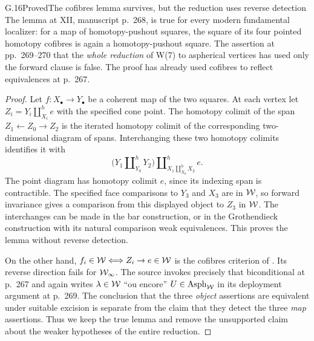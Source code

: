 \begin{claim}{G.16}{Proved}{The cofibres lemma survives, but the reduction uses reverse detection}
The lemma at XII, manuscript p.~268, is true for every modern fundamental localizer: for a map of homotopy-pushout squares, the square of its four pointed homotopy cofibres is again a homotopy-pushout square. The assertion at pp.~269--270 that the \emph{whole reduction} of W(7) to aspherical vertices has used only the forward clause is false. The proof has already used cofibres to reflect equivalences at p.~267.
\end{claim}
\begin{proof}
Let $f:X_\bullet\to Y_\bullet$ be a coherent map of the two squares. At each vertex let $Z_i=Y_i\amalg^h_{X_i}e$ with the specified cone point. The homotopy colimit of the span $Z_1\leftarrow Z_0\to Z_2$ is the iterated homotopy colimit of the corresponding two-dimensional diagram of spans. Interchanging these two homotopy colimits identifies it with
\[
\bigl(Y_1\amalg^h_{Y_0}Y_2\bigr)
\amalg^h_{X_1\amalg^h_{X_0}X_2}e.
\]
The point diagram has homotopy colimit $e$, since its indexing span is contractible. The specified face comparisons to $Y_3$ and $X_3$ are in $\mathcal{W}$, so forward invariance gives a comparison from this displayed object to $Z_3$ in $\mathcal{W}$. The interchanges can be made in the bar construction, or in the Grothendieck construction with its natural comparison weak equivalences. This proves the lemma without reverse detection.

On the other hand, $f_i\in\mathcal{W}\Longleftrightarrow Z_i\to e\in\mathcal{W}$ is the cofibres criterion of . Its reverse direction fails for $\mathcal{W}_{\infty}$. The source invokes precisely that biconditional at p.~267 and again writes $\lambda\in\mathcal{W}$ ``ou encore'' $U\in\mathrm{Asph}_{\mathcal{W}}$ in its deployment argument at p.~269. The conclusion that the three \emph{object} assertions are equivalent under suitable excision is separate from the claim that they detect the three \emph{map} assertions. Thus we keep the true lemma and remove the unsupported claim about the weaker hypotheses of the entire reduction.
\end{proof}

